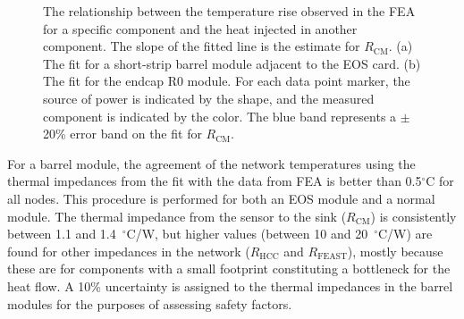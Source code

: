 \begin{figure}[ht]
\centering
{}\quad\quad
{}
\caption{The relationship between the temperature rise observed in the FEA for a specific component and the heat injected in another component. The slope of the fitted line is the estimate for $R_\text{CM}$.
(a) The fit for a short-strip barrel module adjacent to the EOS card. (b) The fit for the endcap R0 module.
For each data point marker, the source of power is indicated by the shape, and the measured component is indicated
by the color.
The blue band represents a $\pm$20\% error band on the fit for $R_\text{CM}$.
}
\label{fig:solving_for_Rcm}
\end{figure}


For a barrel module, the agreement of the network temperatures using the thermal impedances from the fit with the data from FEA is better than 0.5$^\circ$C for all nodes. This procedure is performed for both an EOS module and a normal module. The thermal impedance from the sensor to the sink ($R_\text{CM}$) is consistently between 1.1 and 1.4~$^\circ$C/W, but higher values (between 10 and 20~$^\circ$C/W) are found for other impedances in the network ($R_\text{HCC}$ and $R_\text{FEAST}$), mostly because these are for components with a small footprint constituting a bottleneck for the heat flow.
A 10\% uncertainty is assigned to the thermal impedances in the barrel modules for the purposes of assessing safety factors.


